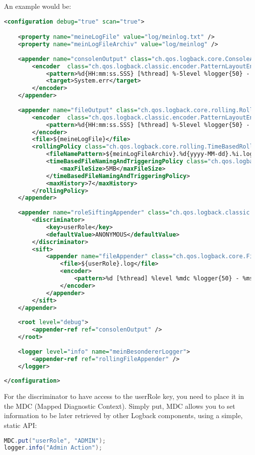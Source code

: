 An example would be: 
\begin{lstlisting}[language=xml]
<configuration debug="true" scan="true">

    <property name="meineLogFile" value="log/meinlog.txt" />
    <property name="meinLogFileArchiv" value="log/meinlog" />
    
    <appender name="consolenOutput" class="ch.qos.logback.core.ConsoleAppender">
        <encoder  class="ch.qos.logback.classic.encoder.PatternLayoutEncoder">
            <pattern>%d{HH:mm:ss.SSS} [%thread] %-5level %logger{50} - %msg%n</pattern>
            <target>System.err</target>
        </encoder>
    </appender>
    
    <appender name="fileOutput" class="ch.qos.logback.core.rolling.RollingFileAppender">
        <encoder  class="ch.qos.logback.classic.encoder.PatternLayoutEncoder">
            <pattern>%d{HH:mm:ss.SSS} [%thread] %-5level %logger{50} - %msg%n</pattern>
        </encoder>
        <file>${meineLogFile}</file>
        <rollingPolicy class="ch.qos.logback.core.rolling.TimeBasedRollingPolicy">
			<fileNamePattern>${meinLogFileArchiv}.%d{yyyy-MM-dd}.%i.log</fileNamePattern>
			<timeBasedFileNamingAndTriggeringPolicy class="ch.qos.logback.core.rolling.SizeAndTimeBasedFNATP">
				<maxFileSize>5MB</maxFileSize>
			</timeBasedFileNamingAndTriggeringPolicy>
			<maxHistory>7</maxHistory>
		</rollingPolicy>
    </appender>
    
    <appender name="roleSiftingAppender" class="ch.qos.logback.classic.sift.SiftingAppender">
        <discriminator>
            <key>userRole</key>
            <defaultValue>ANONYMOUS</defaultValue>
        </discriminator>
        <sift>
            <appender name="fileAppender" class="ch.qos.logback.core.FileAppender">
                <file>${userRole}.log</file>
                <encoder>
                    <pattern>%d [%thread] %level %mdc %logger{50} - %msg%n</pattern>
                </encoder>
            </appender>
        </sift>
    </appender>
    
    <root level="debug">
        <appender-ref ref="consolenOutput" />
    </root>
    
    <logger level="info" name="meinBesondererLogger">
        <appender-ref ref="rollingFileAppender" />
    </logger>
    
</configuration>
\end{lstlisting}
For the discriminator to have access to the userRole key, you need to place it in the MDC (Mapped Diagnostic Context). Simply put, MDC allows you to set information to be later retrieved by other Logback components, using a simple, static API:
\begin{lstlisting}[language=java]
MDC.put("userRole", "ADMIN");
logger.info("Admin Action");
\end{lstlisting}


